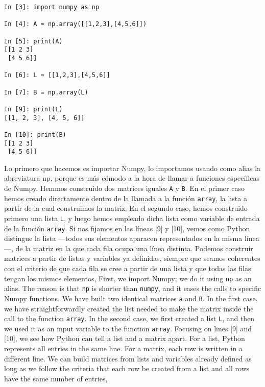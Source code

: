\begin{center}
    \begin{minipage}{0.4\textwidth}
    \begin{verbatim}
In [3]: import numpy as np

In [4]: A = np.array([[1,2,3],[4,5,6]])

In [5]: print(A)
[[1 2 3]
 [4 5 6]]

In [6]: L = [[1,2,3],[4,5,6]]

In [7]: B = np.array(L)

In [9]: print(L)
[[1, 2, 3], [4, 5, 6]]

In [10]: print(B)
[[1 2 3]
 [4 5 6]]
 \end{verbatim}
\end{minipage}
 \end{center}
\begin{paracol}{2} 
Lo primero que hacemos es importar Numpy, lo importamos usando como alias la abreviatura np, porque es más cómodo a la hora de llamar a funciones específicas de Numpy.  Hemmos construido dos matrices iguales \texttt{A} y \texttt{B}. En el primer caso hemos creado directamente dentro de la llamada a la función \texttt{array}, la lista a partir de la cual construimos la matriz. En el segundo caso, hemos construido primero una lista \texttt{L}, y luego hemos empleado dicha lista como variable de entrada de la función \texttt{array}. Si nos fijamos en las líneas [9] y [10], vemos como Python distingue la lista ---todos sus elementos aparacen representados en la misma línea---, de la matriz en la que cada fila ocupa una línea distinta. Podemos construir matrices a partir de listas y variables ya definidas, siempre que seamos coherentes con el criterio de que cada fila se cree a partir de una lista y que todas las filas tengan los mismos elementos,
\switchcolumn
First, we import Numpy; we do it using \texttt{np} as an alias. The reason is that \texttt{np} is shorter than \texttt{numpy}, and it eases the calls to specific Numpy functions. We have built two identical matrices \texttt{a} and \texttt{B}. In the first case, we have straightforwardly created the list needed to make the matrix inside the call to the function \texttt{array}. In the second case, we first created a list \texttt{L}, and then we used it as an input variable to the function \texttt{array}. Focusing on lines [9] and [10], we see how Python can tell a list and a matrix apart. For a list, Python represents all entries in the same line. For a matrix, each row is written in a different line.
We can build matrices from lists and variables already defined as long as we follow the criteria that each row be created from a list and all rows have the same number of entries,  
\end{paracol}
